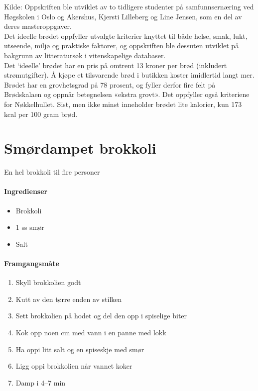 \documentclass[12pt,a4paper]{book}
\begin{document}
Kilde: Oppskriften ble utviklet av to tidligere studenter på samfunnsernæring ved Høgskolen i Oslo og Akershus, Kjersti Lilleberg og Line Jensen, som en del av deres masteroppgaver.\\

Det ideelle brødet oppfyller utvalgte kriterier knyttet til både helse, smak, lukt, utseende, miljø og praktiske faktorer, og oppskriften ble dessuten utviklet på bakgrunn av litteratursøk i vitenskapelige databaser.\\

Det `ideelle' brødet har en pris på omtrent 13 kroner per brød (inkludert strømutgifter). Å kjøpe et tilsvarende brød i butikken koster imidlertid langt mer.\\

Brødet har en grovhetsgrad på 78 prosent, og fyller derfor fire felt på Brødskalaen og oppnår betegnelsen «ekstra grovt». Det oppfyller også kriteriene for Nøkkelhullet. Sist, men ikke minst inneholder brødet lite kalorier, kun 173 kcal per 100 gram brød.\\
\clearpage{}
\clearpage{}\section{﻿Smørdampet brokkoli}
\label{brokkoli}
En hel brokkoli til fire personer

\paragraph{Ingredienser}
\begin{itemize}[noitemsep]
	\item Brokkoli
	\item 1 ss smør
	\item Salt
\end{itemize}

\paragraph{Framgangsmåte}
\begin{enumerate}[noitemsep]
	\item Skyll brokkolien godt
	\item Kutt av den tørre enden av stilken
	\item Sett brokkolien på hodet og del den opp i spiselige biter
	\item Kok opp noen cm med vann i en panne med lokk
	\item Ha oppi litt salt og en spiseskje med smør
	\item Ligg oppi brokkolien når vannet koker
	\item Damp i 4--7 min
\end{enumerate}
\end{document}
